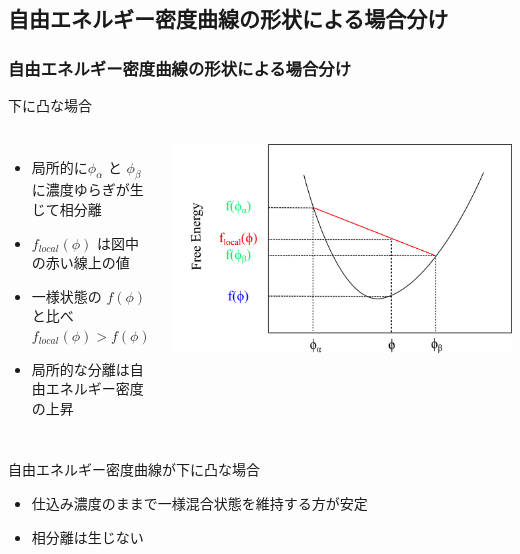\documentclass[unicode,12pt]{beamer}%
\begin{document}
\subsection{自由エネルギー密度曲線の形状による場合分け}
\begin{frame}
	\frametitle{自由エネルギー密度曲線の形状による場合分け}
		\begin{block}{下に凸な場合}
			\begin{columns}[c, onlytextwidth]
					\begin{itemize}
						\item 局所的に$\phi _\alpha$ と $\phi _\beta$ に濃度ゆらぎが生じて相分離
						\item $f_{local}(\phi)$ は図中の赤い線上の値
						\item 一様状態の $f (\phi)$ と比べ\\
						$f_{local}(\phi) > f (\phi)$
						\item \alert{局所的な分離は自由エネルギー密度の上昇}
					\end{itemize}
						\centering
							\includegraphics[width=\textwidth]{freeEform_2.png}
			\end{columns}
		\end{block}
 
		\begin{alertblock}{自由エネルギー密度曲線が下に凸な場合}
			\begin{itemize}
				\item 仕込み濃度のままで一様混合状態を維持する方が安定
				\item 相分離は生じない
			\end{itemize}
		\end{alertblock}
\end{frame}
\end{document}
